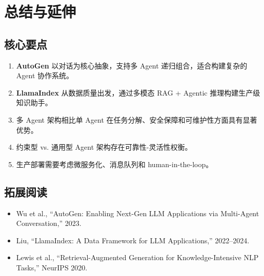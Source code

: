 \section{总结与延伸}

\subsection{核心要点}

\begin{enumerate}
    \item \textbf{AutoGen} 以对话为核心抽象，支持多 Agent 递归组合，适合构建复杂的 Agent 协作系统。
    \item \textbf{LlamaIndex} 从数据质量出发，通过多模态 RAG + Agentic 推理构建生产级知识助手。
    \item 多 Agent 架构相比单 Agent 在任务分解、安全保障和可维护性方面具有显著优势。
    \item 约束型 vs. 通用型 Agent 架构存在可靠性-灵活性权衡。
    \item 生产部署需要考虑微服务化、消息队列和 human-in-the-loop。
\end{enumerate}

\subsection{拓展阅读}

\begin{itemize}
    \item Wu et al., ``AutoGen: Enabling Next-Gen LLM Applications via Multi-Agent Conversation,'' 2023.
    \item Liu, ``LlamaIndex: A Data Framework for LLM Applications,'' 2022--2024.
    \item Lewis et al., ``Retrieval-Augmented Generation for Knowledge-Intensive NLP Tasks,'' NeurIPS 2020.
\end{itemize}


